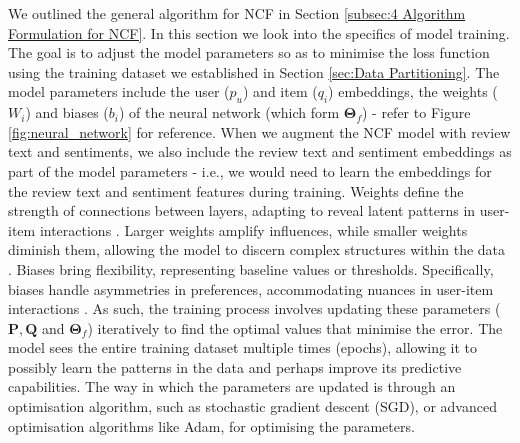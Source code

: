 We outlined the general algorithm for NCF in Section \ref{subsec:4 Algorithm Formulation for NCF}. In this section we look into the specifics of model training. The goal is to adjust the model parameters so as to minimise the loss function using the training dataset we established in Section \ref{sec:Data Partitioning}. The model parameters include the user ($p_u$) and item ($q_i$) embeddings, the weights ($W_i$) and biases ($b_i$) of the neural network (which form $\boldsymbol{\Theta}_f$) - refer to Figure \ref{fig:neural_network} for reference. When we augment the NCF model with review text and sentiments, we also include the review text and sentiment embeddings as part of the model parameters - i.e., we would need to learn the embeddings for the review text and sentiment features during training. Weights define the strength of connections between layers, adapting to reveal latent patterns in user-item interactions \cite{abdi1999neural}. Larger weights amplify influences, while smaller weights diminish them, allowing the model to discern complex structures within the data \cite{gurney2018introduction}. Biases bring flexibility, representing baseline values or thresholds. Specifically, biases handle asymmetries in preferences, accommodating nuances in user-item interactions \cite{he2017neural}. As such, the training process involves updating these parameters ($\mathbf{P}, \mathbf{Q}$ and $\boldsymbol{\Theta}_f$) iteratively to find the optimal values that minimise the error. The model sees the entire training dataset multiple times (epochs), allowing it to possibly learn the patterns in the data and perhaps improve its predictive capabilities. The way in which the parameters are updated is through an optimisation algorithm, such as stochastic gradient descent (SGD), or advanced optimisation algorithms like Adam, for optimising the parameters. 

